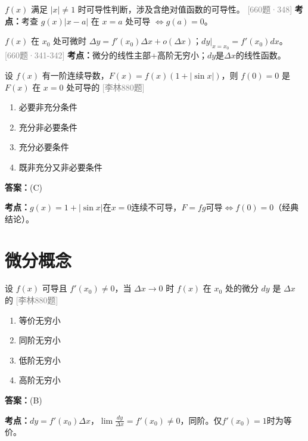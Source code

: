 \documentclass[12pt,a4paper]{ctexbook}
\newcommand{\src}[1]{\hfill\textcolor{gray}{\small\textsf{[#1]}}}
\newcommand{\ans}[1]{\begin{answerbox}\textbf{答案：}#1\end{answerbox}}
\newcommand{\kpt}[1]{\textbf{考点：}#1}
\begin{document}
\bigskip

\begin{exercise}[660题·不可导点·348题]
$f(x)$ 满足 $|x|\neq 1$ 时可导性判断，涉及含绝对值函数的可导性。 \hfill\src{660题·348}
\kpt{考查 $g(x)|x-a|$ 在 $x=a$ 处可导 $\iff g(a)=0$。}
\end{exercise}

\bigskip

\begin{exercise}[660题·可微概念·341-342题]
$f(x)$ 在 $x_0$ 处可微时 $\Delta y=f'(x_0)\Delta x+o(\Delta x)$；$dy|_{x=x_0}=f'(x_0)dx$。 \hfill\src{660题·341-342}
\kpt{微分的线性主部+高阶无穷小；$dy$是$\Delta x$的线性函数。}
\end{exercise}

\bigskip

\begin{exercise}[880题·乘积可导条件]
设 $f(x)$ 有一阶连续导数，$F(x)=f(x)(1+|\sin x|)$，则 $f(0)=0$ 是 $F(x)$ 在 $x=0$ 处可导的 \hfill\src{李林880题}
\begin{enumerate}[label=(\Alph*),nosep]
  \item 必要非充分条件
  \item 充分非必要条件
  \item 充分必要条件
  \item 既非充分又非必要条件
\end{enumerate}
\end{exercise}
\ans{(C)}
\kpt{$g(x)=1+|\sin x|$在$x=0$连续不可导，$F=fg$可导$\iff f(0)=0$（经典结论）。}

\section{微分概念}

\begin{exercise}[880题·微分与无穷小阶]
设 $f(x)$ 可导且 $f'(x_0)\neq 0$，当 $\Delta x\to 0$ 时 $f(x)$ 在 $x_0$ 处的微分 $dy$ 是 $\Delta x$ 的 \hfill\src{李林880题}
\begin{enumerate}[label=(\Alph*),nosep]
  \item 等价无穷小
  \item 同阶无穷小
  \item 低阶无穷小
  \item 高阶无穷小
\end{enumerate}
\end{exercise}
\ans{(B)}
\kpt{$dy=f'(x_0)\Delta x$，$\lim\frac{dy}{\Delta x}=f'(x_0)\neq 0$，同阶。仅$f'(x_0)=1$时为等价。}

\bigskip
\end{document}

